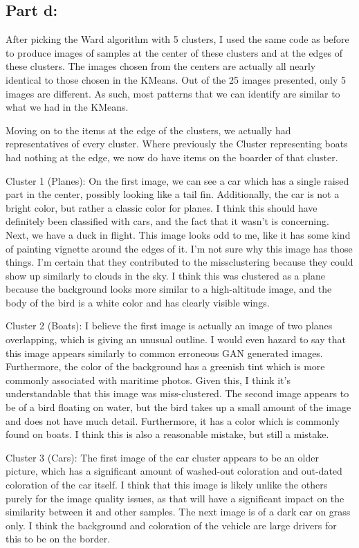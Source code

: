 \documentclass[12pt]{article}
\begin{document}
\subsection{Part d:}
After picking the Ward algorithm with 5 clusters, I used the same code as before to produce images of samples at the center 
of these clusters and at the edges of these clusters. The images chosen from the centers are actually all nearly identical 
to those chosen in the KMeans. Out of the 25 images presented, only 5 images are different.
As such, most patterns that we can identify are similar to what we had in the KMeans.

Moving on to the items at the edge of the clusters, we actually had representatives of every cluster. Where previously the 
Cluster representing boats had nothing at the edge, we now do have items on the boarder of that cluster.

Cluster 1 (Planes): On the first image, we can see a car which has a single raised part in the center, possibly looking 
like a tail fin. Additionally, the car is not a bright color, but rather a classic color for planes. I think this should 
have definitely been classified with cars, and the fact that it wasn't is concerning. Next, we have a duck in flight. This 
image looks odd to me, like it has some kind of painting vignette around the edges of it. I'm not sure why this image has
those things. I'm certain that they contributed to the missclustering because they could show up similarly to clouds in 
the sky. I think this was clustered as a plane because the background looks more similar to a high-altitude image, and 
the body of the bird is a white color and has clearly visible wings.

Cluster 2 (Boats): I believe the first image is actually an image of two planes overlapping, which is giving an unusual 
outline. I would even hazard to say that this image appears similarly to common erroneous GAN generated images. Furthermore,
the color of the background has a greenish tint which is more commonly associated with maritime photos. Given this, I think
it's understandable that this image was miss-clustered. The second image appears to be of a bird floating on water, but 
the bird takes up a small amount of the image and does not have much detail. Furthermore, it has a color which is commonly
found on boats. I think this is also a reasonable mistake, but still a mistake.

Cluster 3 (Cars): The first image of the car cluster appears to be an older picture, which has a significant amount of
washed-out coloration and out-dated coloration of the car itself. I think that this image is likely unlike the others purely
for the image quality issues, as that will have a significant impact on the similarity between it and other samples. 
The next image is of a dark car on grass only. I think the background and coloration of the vehicle are large drivers for 
this to be on the border. 
\end{document}
